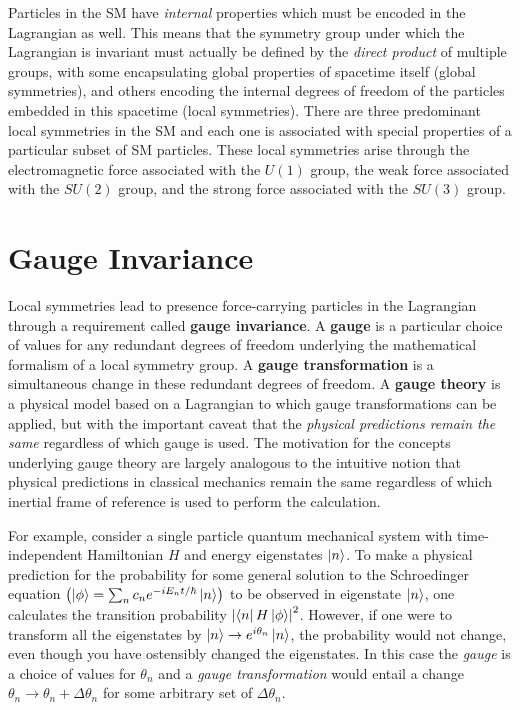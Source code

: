 Particles in the SM have \textit{internal} properties which must be encoded in the Lagrangian as well.
This means that the symmetry group under which the Lagrangian is invariant must actually be defined by the \textit{direct product} of multiple groups, with some encapsulating global properties of spacetime itself (global symmetries), and others encoding the internal degrees of freedom of the particles embedded in this spacetime (local symmetries).
There are three predominant local symmetries in the SM and each one is associated with special properties of a particular subset of SM particles.
These local symmetries arise through the electromagnetic force associated with the $U(1)$ group, the weak force associated with the $SU(2)$ group, and the strong force associated with the $SU(3)$ group.


\section{Gauge Invariance}
Local symmetries lead to presence force-carrying particles in the Lagrangian through a requirement called \textbf{gauge invariance}.
A \textbf{gauge} is a particular choice of values for any redundant degrees of freedom underlying the mathematical formalism of a local symmetry group.
A \textbf{gauge transformation} is a simultaneous change in these redundant degrees of freedom.
A \textbf{gauge theory} is a physical model based on a Lagrangian to which gauge transformations can be applied, but with the important caveat that the \textit{physical predictions remain the same} regardless of which gauge is used.
The motivation for the concepts underlying gauge theory are largely analogous to the intuitive notion that physical predictions in classical mechanics remain the same regardless of which inertial frame of reference is used to perform the calculation.

For example, consider a single particle quantum mechanical system with time-independent Hamiltonian $H$ and energy eigenstates $\ket{n}$.
To make a physical prediction for the probability for some general solution to the Schroedinger equation $\left( \ket{\phi} = \sum_n c_n e^{-iE_nt / \hbar} \ket{n} \right)$ to be observed in eigenstate $\ket{n}$, one calculates the transition probability $\left| \bra{n} H \ket{\phi} \right|^2$.
However, if one were to transform all the eigenstates by $\ket{n} \rightarrow e^{i\theta_n} \ket{n}$, the probability would not change, even though you have ostensibly changed the eigenstates.
In this case the \textit{gauge} is a choice of values for $\theta_n$ and a \textit{gauge transformation} would entail a change $\theta_n \rightarrow \theta_n + \Delta\theta_n$ for some arbitrary set of $\Delta\theta_n$.


